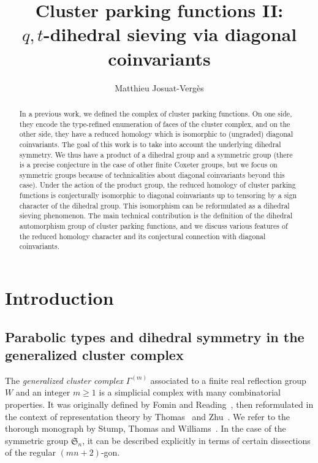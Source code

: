 \documentclass[11pt]{article}
\title{Cluster parking functions II: \\ $q,t$-dihedral sieving via diagonal coinvariants}
\author{Matthieu Josuat-Vergès}
\affil{Université Paris Cité, CNRS, IRIF}
\theoremstyle{definition}
\begin{document}
\maketitle

\begin{abstract}
    In a previous work, we defined the complex of cluster parking functions.  On one side, they encode the type-refined enumeration of faces of the cluster complex, and on the other side, they have a reduced homology which is isomorphic to (ungraded) diagonal coinvariants. The goal of this work is to take into account the underlying dihedral symmetry.  We thus have a product of a dihedral group and a symmetric group (there is a precise conjecture in the case of other finite Coxeter groups, but we focus on symmetric groups because of technicalities about diagonal coinvariants beyond this case).  Under the action of the product group, the reduced homology of cluster parking functions is conjecturally isomorphic to diagonal coinvariants up to tensoring by a sign character of the dihedral group.  This isomorphism can be reformulated as a dihedral sieving phenomenon.  The main technical contribution is the definition of the dihedral automorphism group of cluster parking functions, and we discuss various features of the reduced homology character and its conjectural connection with diagonal coinvariants.
\end{abstract}


\section{Introduction}

\subsection{Parabolic types and dihedral symmetry in the generalized cluster complex}

The {\it generalized cluster complex} $\Gamma^{(m)}$ associated to a finite real reflection group $W$ and an integer $m \geq 1$ is a simplicial complex with many combinatorial properties.  It was originally defined by Fomin and Reading~\cite{fominreading}, then reformulated in the context of representation theory by Thomas~\cite{thomas} and Zhu~\cite{zhu}. We refer to the thorough monograph by Stump, Thomas and Williams~\cite{stumpthomaswilliams}.  In the case of the symmetric group $\mathfrak{S}_n$, it can be described explicitly in terms of certain dissections of the regular $(mn+2)$-gon.
\end{document}
